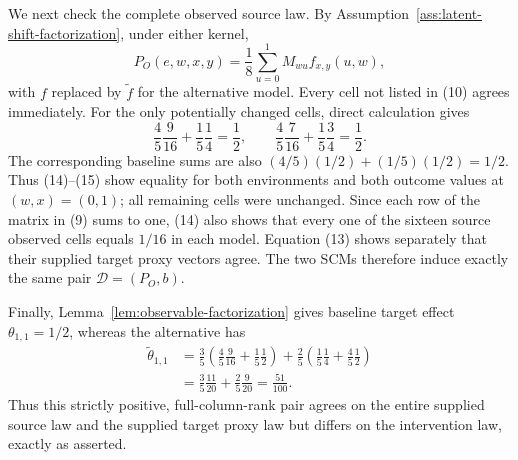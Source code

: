 We next check the complete observed source law. By Assumption~\ref{ass:latent-shift-factorization}, under either kernel,
\[
P_O(e,w,x,y)=\frac18\sum_{u=0}^1 M_{wu}f_{x,y}(u,w),
\tag{14}
\]
with \(f\) replaced by \(\widetilde f\) for the alternative model. Every cell not listed in (10) agrees immediately. For the only potentially changed cells, direct calculation gives
\[
\frac45\frac9{16}+\frac15\frac14=\frac12,
\qquad
\frac45\frac7{16}+\frac15\frac34=\frac12.
\tag{15}
\]
The corresponding baseline sums are also \((4/5)(1/2)+(1/5)(1/2)=1/2\). Thus (14)--(15) show equality for both environments and both outcome values at \((w,x)=(0,1)\); all remaining cells were unchanged. Since each row of the matrix in (9) sums to one, (14) also shows that every one of the sixteen source observed cells equals \(1/16\) in each model. Equation (13) shows separately that their supplied target proxy vectors agree. The two SCMs therefore induce exactly the same pair \(\mathcal D=(P_O,b)\).

Finally, Lemma~\ref{lem:observable-factorization} gives baseline target effect \(\theta_{1,1}=1/2\), whereas the alternative has
\[
\begin{aligned}
\widetilde\theta_{1,1}
&=\frac35\left(\frac45\frac9{16}+\frac15\frac12\right)
 +\frac25\left(\frac15\frac14+\frac45\frac12\right)\\
&=\frac35\frac{11}{20}+\frac25\frac9{20}
=\frac{51}{100}.
\end{aligned}
\tag{16}
\]
Thus this strictly positive, full-column-rank pair agrees on the entire supplied source law and the supplied target proxy law but differs on the intervention law, exactly as asserted.